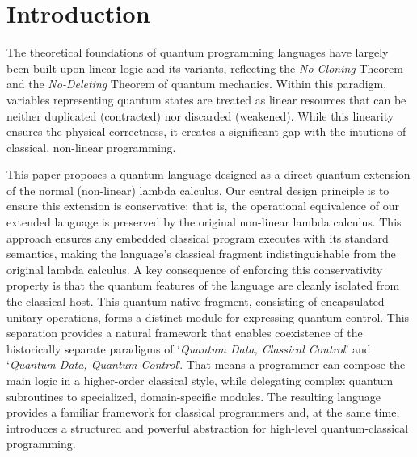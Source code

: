 \section{Introduction} \label{sec:intro}
The theoretical foundations of quantum programming languages have largely been built upon linear logic and its variants\cite{VANTONDER2004_LambdaCalculusQuantum,SELINGER2009_QuantumLambdaCalculus,ALTENKIRCH2005_FunctionalQuantumProgramming,SABRY2018_SymmetricPatternMatchingQuantum,ROSS2017_AlgebraicLogicalMethods}, reflecting the \textit{No-Cloning} Theorem and the \textit{No-Deleting} Theorem of quantum mechanics.
Within this paradigm, variables representing quantum states are treated as linear resources that can be neither duplicated (contracted) nor discarded (weakened).
While this linearity ensures the physical correctness, it creates a significant gap with the intutions of classical, non-linear programming.

This paper proposes a quantum language designed as a direct quantum extension of the normal (non-linear) lambda calculus.
Our central design principle is to ensure this extension is conservative; that is, the operational equivalence of our extended language is preserved by the original non-linear lambda calculus.
This approach ensures any embedded classical program executes with its standard semantics, making the language's classical fragment indistinguishable from the original lambda calculus.
A key consequence of enforcing this conservativity property is that the quantum features of the language are cleanly isolated from the classical host.
This quantum-native fragment, consisting of encapsulated unitary operations, forms a distinct module for expressing quantum control.
This separation provides a natural framework that enables coexistence of the historically separate paradigms of `\textit{Quantum Data, Classical Control}' and `\textit{Quantum Data, Quantum Control}'.
That means a programmer can compose the main logic in a higher-order classical style, while delegating complex quantum subroutines to specialized, domain-specific modules.
The resulting language provides a familiar framework for classical programmers and, at the same time, introduces a structured and powerful abstraction for high-level quantum-classical programming.
